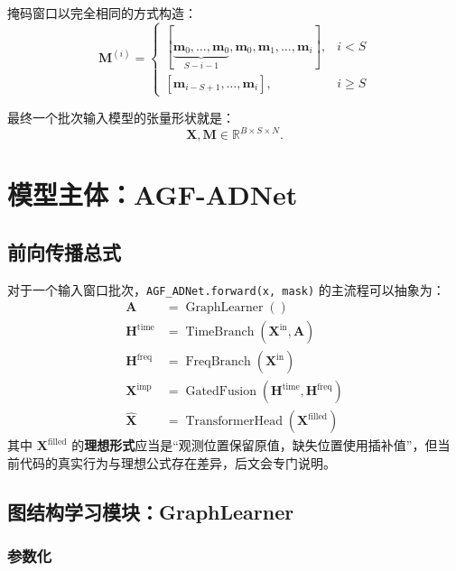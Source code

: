 \documentclass[UTF8]{ctexart}
\begin{document}
掩码窗口以完全相同的方式构造：
\begin{equation}
    \bm{M}^{(i)} =
    \begin{cases}
        [\underbrace{\bm{m}_0,\dots,\bm{m}_0}_{S-i-1},\bm{m}_0,\bm{m}_1,\dots,\bm{m}_i], & i < S \\
        [\bm{m}_{i-S+1}, \dots, \bm{m}_i], & i \ge S
    \end{cases}
\end{equation}

最终一个批次输入模型的张量形状就是：
\begin{equation}
    \bm{X}, \bm{M} \in \mathbb{R}^{B \times S \times N}.
\end{equation}

\section{模型主体：AGF-ADNet}

\subsection{前向传播总式}

对于一个输入窗口批次，\texttt{AGF\_ADNet.forward(x, mask)} 的主流程可以抽象为：
\begin{align}
    \bm{A} &= \operatorname{GraphLearner}() \\
    \bm{H}^{\text{time}} &= \operatorname{TimeBranch}(\bm{X}^{\text{in}}, \bm{A}) \\
    \bm{H}^{\text{freq}} &= \operatorname{FreqBranch}(\bm{X}^{\text{in}}) \\
    \bm{X}^{\text{imp}} &= \operatorname{GatedFusion}(\bm{H}^{\text{time}}, \bm{H}^{\text{freq}}) \\
    \hat{\bm{X}} &= \operatorname{TransformerHead}(\bm{X}^{\text{filled}})
\end{align}
其中 $\bm{X}^{\text{filled}}$ 的\textbf{理想形式}应当是“观测位置保留原值，缺失位置使用插补值”，但当前代码的真实行为与理想公式存在差异，后文会专门说明。

\subsection{图结构学习模块：GraphLearner}

\subsubsection{参数化}
\end{document}
